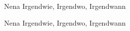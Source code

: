 \documentclass[a4paper]{article}
\begin{document}
	\begin{mytcbox}{Nena}
		Irgendwie, Irgendwo, Irgendwann
	\end{mytcbox}
	
	\begin{mytcbox2}{Nena}
		Irgendwie, Irgendwo, Irgendwann
	\end{mytcbox2}
%	
\end{document}
